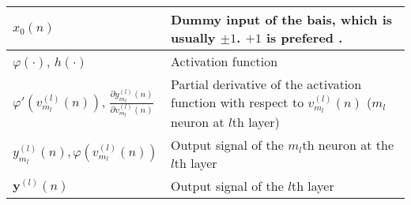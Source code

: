 \documentclass{article}
\begin{document}
\begin{xltabular}{\textwidth}{XX}
	\(x_0(n)\)                                                                                                                                                                     & Dummy input of the bais, which is usually \(\pm 1\). \(+1\) is prefered \cite{bishopPatternRecognitionMachine2006,haykinNeuralNetworksLearning2009}.                                                                                                                                                                                   \\ \hline
	\(\varphi(\cdot)\)\cite{haykinNeuralNetworksLearning2009}, \(h(\cdot)\)\cite{bishopPatternRecognitionMachine2006}                                                              & Activation function                                                                                                                                                                                                                                                                                                                    \\ \hline
	\(\varphi'(v_{m_l}^{(l)}(n))\)\cite{haykinNeuralNetworksLearning2009}, \(\frac{\partial y_{m_l}^{(l)}(n)}{\partial v_{m_l}^{(l)}(n)}\) \cite{haykinNeuralNetworksLearning2009} & Partial derivative of the activation function with respect to \(v_{m_l}^{(l)}(n)\) (\(m_l\) neuron at \(l\)th layer)                                                                                                                                                                                                                   \\ \hline
	\(y_{m_l}^{(l)}(n), \varphi \left( v_{m_l}^{(l)}(n) \right)\)                                                                                                                  & Output signal of the \(m_l\)th neuron at the \(l\)th layer                                                                                                                                                                                                                                                                             \\ \hline
	\(\mathbf{y}^{(l)}(n)\)                                                                                                                                                        & Output signal of the \(l\)th layer                                                                                                                                                                                                                                                                                                     \\ \hline

\end{xltabular}
\end{document}
